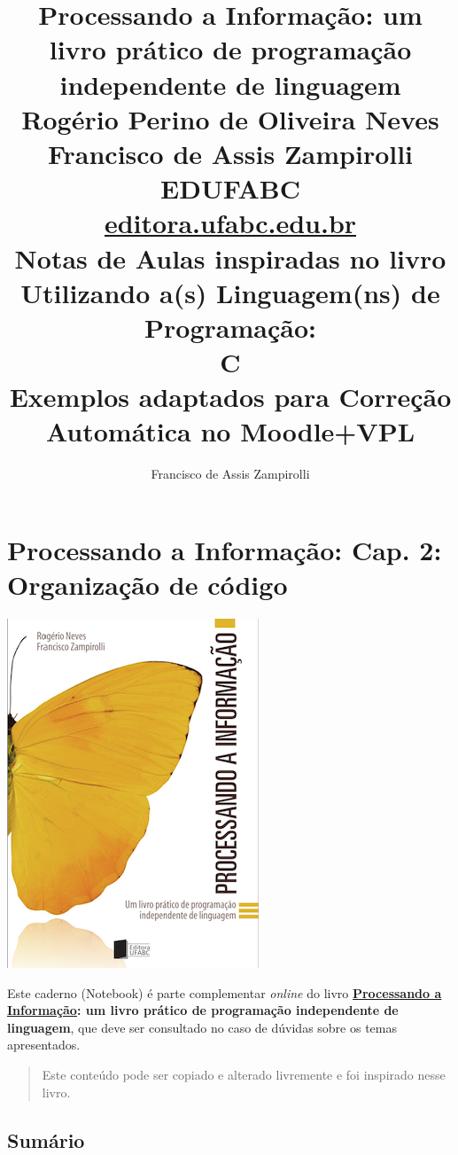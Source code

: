 \documentclass[12pt,a4paper]{article}
\title{Processando a Informação: um livro prático de programação independente de linguagem 
\\\large\vspace{2cm}
Rogério Perino de Oliveira Neves 
\\\vspace{5mm}
Francisco de Assis Zampirolli
\\\large\vspace{2cm}
EDUFABC
\\ \url{editora.ufabc.edu.br}
\\\Huge\vspace{3cm}
Notas de Aulas inspiradas no livro
\\\Large\vspace{1cm}
Utilizando a(s) Linguagem(ns) de Programação: 
\\\Huge\vspace{1cm}
C
\\\large\vspace{1cm}
Exemplos adaptados para Correção Automática no Moodle+VPL
\vspace{2cm}}
\author{Francisco de Assis Zampirolli\vspace{1cm}}
\begin{document}
    
    
\clearpage\maketitle
\thispagestyle{empty}
\tableofcontents

    
    

    
    \hypertarget{processando-a-informauxe7uxe3o-cap.-2-organizauxe7uxe3o-de-cuxf3digo}{%
\section{Processando a Informação: Cap. 2: Organização de
código}\label{processando-a-informauxe7uxe3o-cap.-2-organizauxe7uxe3o-de-cuxf3digo}}

    \includegraphics{"figs/Capa_Processando_Informacao.jpg"}

Este caderno (Notebook) é parte complementar \emph{online} do livro
\textbf{\href{https://editora.ufabc.edu.br/matematica-e-ciencias-da-computacao/58-processando-a-informacao}{Processando
a Informação}: um livro prático de programação independente de
linguagem}, que deve ser consultado no caso de dúvidas sobre os temas
apresentados.

\begin{quote}
Este conteúdo pode ser copiado e alterado livremente e foi inspirado
nesse livro.
\end{quote}

    \hypertarget{sumuxe1rio}{%
\subsection{Sumário}\label{sumuxe1rio}}
\end{document}

